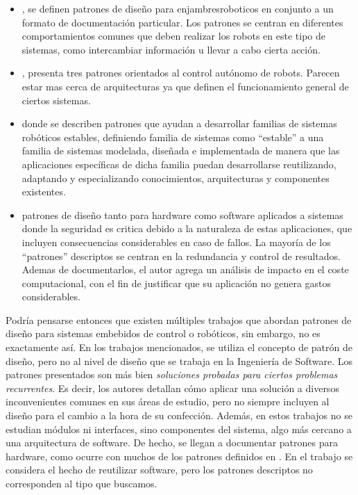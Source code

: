 \begin{itemize}
\item \cite{enjambre}, se definen patrones de diseño para \gls{enjambresroboticos} en conjunto a un formato de documentación particular. Los patrones se centran en diferentes comportamientos comunes que deben realizar los robots en este tipo de sistemas, como intercambiar información u llevar a cabo cierta acción.

\item \cite{patterns_2013}, presenta tres patrones orientados al control autónomo de robots. Parecen estar mas cerca de arquitecturas ya que definen el funcionamiento general de ciertos sistemas.

\item \cite{stable} donde se describen patrones que ayudan a desarrollar familias de sistemas robóticos estables, definiendo familia de sistemas como ``estable'' a una familia de sistemas modelada, diseñada e implementada de manera que las aplicaciones específicas de dicha familia puedan desarrollarse reutilizando, adaptando y especializando conocimientos, arquitecturas y componentes existentes.

\item \cite{critical} patrones de diseño tanto para hardware como software aplicados a sistemas donde la seguridad es critica debido a la naturaleza de estas aplicaciones, que incluyen consecuencias considerables en caso de fallos. La mayoría de los ``patrones'' descriptos se centran en la redundancia y control de resultados. Ademas de documentarlos, el autor agrega un análisis de impacto en el coste computacional, con el fin de justificar que su aplicación no genera gastos considerables.

\end{itemize}

Podría pensarse entonces que existen múltiples trabajos que abordan patrones de diseño para sistemas embebidos de control o robóticos, sin embargo, no es exactamente así. En los trabajos mencionados, se utiliza el concepto de patrón de diseño, pero no al nivel de diseño que se trabaja en la Ingeniería de Software. Los patrones presentados son más bien \textit{soluciones probadas para ciertos problemas recurrentes}. Es decir, los autores detallan cómo aplicar una solución a diversos inconvenientes comunes en sus áreas de estudio, pero no siempre incluyen al diseño para el cambio a la hora de su confección. Además, en estos trabajos no se estudian módulos ni interfaces, sino componentes del sistema, algo más cercano a una arquitectura de software. De hecho, se llegan a documentar patrones para hardware, como ocurre con muchos de los patrones definidos en \cite{critical}. En el trabajo \cite{stable} se considera el hecho de reutilizar software, pero los patrones descriptos no corresponden al tipo que buscamos.

